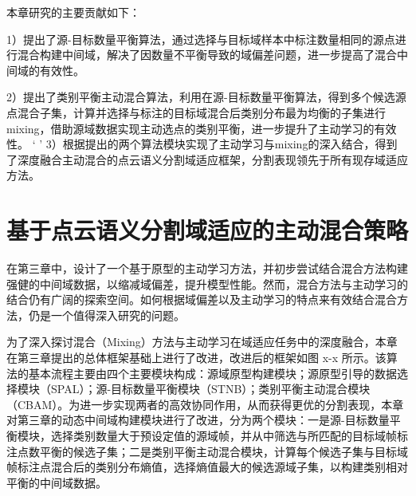     
    本章研究的主要贡献如下：

    1）提出了源-目标数量平衡算法，通过选择与目标域样本中标注数量相同的源点进行混合构建中间域，解决了因数量不平衡导致的域偏差问题，进一步提高了混合中间域的有效性。

    2）提出了类别平衡主动混合算法，利用在源-目标数量平衡算法，得到多个候选源点混合子集，计算并选择与标注的目标域混合后类别分布最为均衡的子集进行mixing，借助源域数据实现主动选点的类别平衡，进一步提升了主动学习的有效性。
`
'
    3）根据提出的两个算法模块实现了主动学习与mixing的深入结合，得到了深度融合主动混合的点云语义分割域适应框架，分割表现领先于所有现存域适应方法。


    \section{基于点云语义分割域适应的主动混合策略}
    在第三章中，设计了一个基于原型的主动学习方法，并初步尝试结合混合方法构建强健的中间域数据，以缩减域偏差，提升模型性能。然而，混合方法与主动学习的结合仍有广阔的探索空间。如何根据域偏差以及主动学习的特点来有效结合混合方法，仍是一个值得深入研究的问题。

    为了深入探讨混合（Mixing）方法与主动学习在域适应任务中的深度融合，本章在第三章提出的总体框架基础上进行了改进，改进后的框架如图 x-x 所示。该算法的基本流程主要由四个主要模块构成：源域原型构建模块；源原型引导的数据选择模块（SPAL）；源-目标数量平衡模块（STNB）；类别平衡主动混合模块（CBAM）。为进一步实现两者的高效协同作用，从而获得更优的分割表现，本章对第三章的动态中间域构建模块进行了改进，分为两个模块：一是源-目标数量平衡模块，选择类别数量大于预设定值的源域帧，并从中筛选与所匹配的目标域帧标注点数平衡的候选子集；二是类别平衡主动混合模块，计算每个候选子集与目标域帧标注点混合后的类别分布熵值，选择熵值最大的候选源域子集，以构建类别相对平衡的中间域数据。


